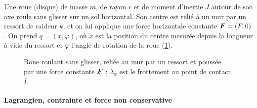 Une roue (disque) de masse $m$, de rayon $r$ et de moment d'inertie
$J$ autour de son axe roule sans glisser sur un sol horizontal. Son
centre est relié à un mur par un ressort de raideur $k$, et on lui
applique une force horizontale constante $\bm{F} = (F,0)$. On prend
$q = (x,\varphi)$, où $x$ est la position du centre mesurée depuis la
longueur à vide du ressort et $\varphi$ l'angle de rotation de la
roue (\cref{fig-roue-ressort}).

\begin{figure}[H]
    \centering
    
    \caption{Roue roulant sans glisser, reliée au mur par un ressort
    et poussée par une force constante $\bm{F}$ ; $\lambda_x$ est le
    frottement au point de contact $I$.}
    \label{fig-roue-ressort}
\end{figure}

\paragraph{Lagrangien, contrainte et force non conservative}

